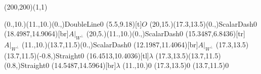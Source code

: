 \unitlength=1bp%

\begin{feynartspicture}(200,200)(1,1)

\FADiagram{}
\FAProp(0.,10.)(11.,10.)(0.,){DoubleLine}{0}
\FALabel(5.5,9.18)[t]{$O$}
\FAProp(20,15.)(17.3,13.5)(0.,){ScalarDash}{0}
\FALabel(18.4987,14.9064)[br]{$A|_{W^\perp}$}
\FAProp(20,5.)(11.,10.)(0.,){ScalarDash}{0}
\FALabel(15.3487,6.8436)[tr]{$A|_{W^\perp}$}
\FAProp(11.,10.)(13.7,11.5)(0.,){ScalarDash}{0}
\FALabel(12.1987,11.4064)[br]{$A|_{W^\perp}$}
\FAProp(17.3,13.5)(13.7,11.5)(-0.8,){Straight}{0}
\FALabel(16.4513,10.4036)[tl]{$\lambda$}
\FAProp(17.3,13.5)(13.7,11.5)(0.8,){Straight}{0}
\FALabel(14.5487,14.5964)[br]{$\lambda$}
\FAVert(11.,10.){0}
\FAVert(17.3,13.5){0}
\FAVert(13.7,11.5){0}
\end{feynartspicture}

